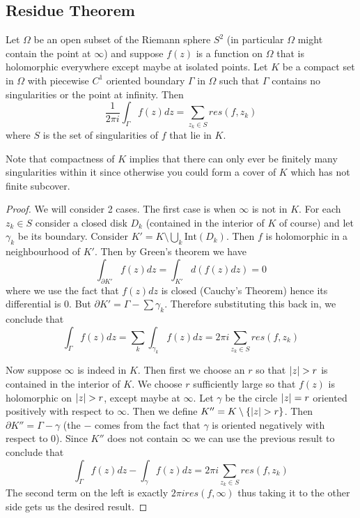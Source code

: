 \subsection{Residue Theorem}
\begin{theorem}
Let $\Omega$ be an open subset of the Riemann sphere $S^2$ (in particular $\Omega$ might contain the point at $\infty$) and suppose $f(z)$ is a function on $\Omega$ that is holomorphic everywhere except maybe at isolated points. Let $K$ be a compact set in $\Omega$ with piecewise $C^1$ oriented boundary $\Gamma$ in $\Omega$ such that $\Gamma$ contains no singularities or the point at infinity. Then 
$$ \frac{1}{2\pi i} \int_{\Gamma} f(z) dz = \sum_{ z_k \in S} res(f, z_k) $$
where $S$ is the set of singularities of $f$ that lie in $K$.
\end{theorem}
\begin{remark}
Note that compactness of $K$ implies that there can only ever be finitely many singularities within it since otherwise you could form a cover of $K$ which has not finite subcover.
\end{remark}
\begin{proof}
We will consider 2 cases. The first case is when $\infty$ is not in $K$. For each $z_k \in S$ consider a closed disk $D_k$ (contained in the interior of $K$ of course) and let $\gamma_k$ be its boundary. Consider $K' = K \setminus \bigcup_k \text{Int}(D_k)$. Then $f$ is holomorphic in a neighbourhood of $K'$. Then by Green's theorem we have 
$$ \int_{\partial K'} f(z) dz = \int_{K'} d(f(z) dz) = 0 $$
where we use the fact that $f(z) dz$ is closed (Cauchy's Theorem) hence its differential is 0. But $\partial K' = \Gamma - \sum \gamma_k$. Therefore substituting this back in, we conclude that 
$$ \int_\Gamma f(z) dz = \sum_{k} \int_{\gamma_k} f(z) dz = 2\pi i \sum_{z_k \in S} res(f, z_k) $$

Now suppose $\infty$ is indeed in $K$. Then first we choose an $r$ so that $\left|z\right| > r$ is contained in the interior of $K$. We choose $r$ sufficiently large so that $f(z)$ is holomorphic on $\left|z\right| > r$, except maybe at $\infty$. Let $\gamma$ be the circle $\left|z\right| = r$ oriented positively with respect to $\infty$. Then we define $K'' = K \setminus \{\left|z\right| > r\}$. Then $\partial K'' = \Gamma - \gamma$ (the $-$ comes from the fact that $\gamma$ is oriented negatively with respect to 0). Since $K''$ does not contain $\infty$ we can use the previous result to conclude that 
$$ \int_{\Gamma} f(z) dz - \int_\gamma f(z) dz = 2\pi i \sum_{z_k \in S} res(f, z_k) $$
The second term on the left is exactly $2\pi ires(f, \infty)$ thus taking it to the other side gets us the desired result.
\end{proof}

